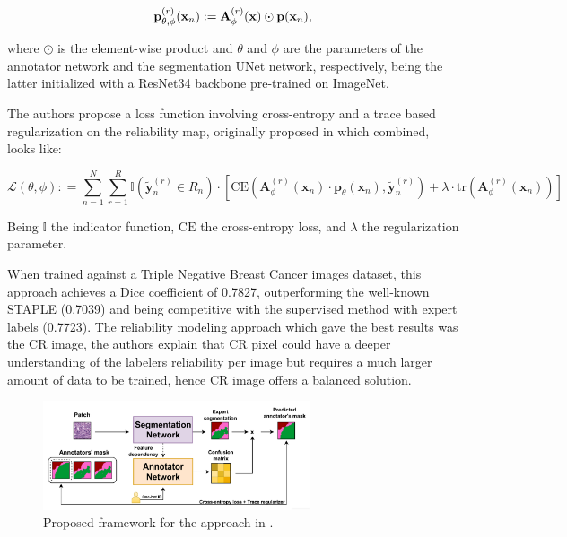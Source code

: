 \begin{equation}
  \label{eq:estimated_segmentation}
  \mathbf{p}^{(r)}_{\theta,\phi}(\mathbf{x}_n) :=
  \mathbf{A}^{(r)}_{\phi}(\mathbf{x}) \odot \mathbf{p}(\mathbf{x}_n),
\end{equation}

where $\odot$ is the element-wise product and $\theta$ and $\phi$ are
the parameters of the annotator network and the segmentation UNet
network, respectively, being the latter initialized with a ResNet34 backbone
pre-trained on ImageNet.

The authors propose a loss function involving cross-entropy and a trace based
regularization on the reliability map, originally proposed in
\cite{ZhangEtAl2020} which combined, looks like:

\begin{equation}
  \mathcal{L}(\theta, \phi) : = \sum_{n=1}^{N} \sum_{r=1}^{R}
  \mathbb{I} \left( \tilde{\mathbf{y}}_{n}^{(r)} \in R_n \right)
  \cdot \left[ \text{CE} \left( \mathbf{A}_{\phi}^{(r)}
      (\mathbf{x}_n) \cdot \mathbf{p}_{\theta} (\mathbf{x}_n),
    \tilde{\mathbf{y}}_{n}^{(r)} \right) + \lambda \cdot \text{tr}
  \left( \mathbf{A}_{\phi}^{(r)} (\mathbf{x}_n) \right) \right]
\end{equation}

Being $\mathbb{I}$ the indicator function, $\text{CE}$ the cross-entropy loss,
and $\lambda$ the regularization parameter.

When trained against a Triple Negative Breast Cancer images dataset,
this approach achieves a Dice coefficient of 0.7827, outperforming
the well-known STAPLE (0.7039) and being competitive with the
supervised method with expert labels (0.7723). The reliability
modeling approach which gave the best results was the CR image, the
authors explain that CR pixel could have a deeper understanding of
the labelers reliability per image but requires a much larger amount
of data to be trained, hence CR image offers a balanced solution.

\begin{figure}
  \centering
  \includegraphics[width=0.7\textwidth]{Cap1/Figures/lopez_2024_proposed_framework.png}
  \caption{Proposed framework for the approach in \cite{LopezEtAl2024}.}
  \label{fig:lopez_2024_proposed_framework}
\end{figure}